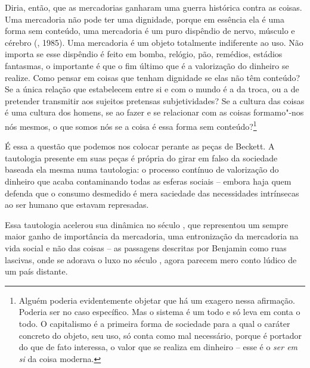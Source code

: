 Diria, então, que as mercadorias ganharam uma guerra
histórica contra as coisas. Uma mercadoria não pode ter uma dignidade,
porque em essência ela é uma forma sem conteúdo, uma mercadoria é um
puro dispêndio de nervo, músculo e cérebro (, 1985). Uma mercadoria
é um objeto totalmente indiferente ao uso. Não importa se esse dispêndio
é feito em bomba, relógio, pão, remédios, estádios fantasmas, o
importante é que o fim último que é a valorização do dinheiro se
realize. Como pensar em coisas que tenham dignidade se elas não têm
conteúdo? Se a única relação que estabelecem entre si e com o mundo é a
da troca, ou a de pretender transmitir aos sujeitos pretensas
subjetividades? Se a cultura das coisas é uma cultura dos homens, se ao
fazer e se relacionar com as coisas formamo"-nos nós mesmos, o que somos
nós se a coisa é essa forma sem conteúdo?\footnote{Alguém poderia
  evidentemente objetar que há um exagero nessa afirmação. Poderia ser
  no caso específico. Mas o sistema é um todo e só leva em conta o todo.
  O capitalismo é a primeira forma de sociedade para a qual o caráter
  concreto do objeto, seu uso, só conta como mal necessário, porque é
  portador do que de fato interessa, o valor que se realiza em dinheiro
  -- esse é o \emph{ser em si} da coisa moderna.}

É essa a questão que podemos nos colocar perante as peças de Beckett.
A tautologia presente em suas peças é própria do girar em
falso da sociedade baseada ela mesma numa tautologia: o processo
contínuo de valorização do dinheiro que acaba contaminando todas as
esferas sociais -- embora haja quem defenda que o consumo desmedido é
mera saciedade das necessidades intrínsecas ao ser humano que estavam
represadas.

Essa tautologia acelerou sua dinâmica no século , que representou um
sempre maior ganho de importância da mercadoria, uma entronização da
mercadoria na vida social e não das coisas -- as passagens descritas por
Benjamin como ruas lascivas, onde se adorava o luxo no século , agora
parecem mero conto lúdico de um país distante.

